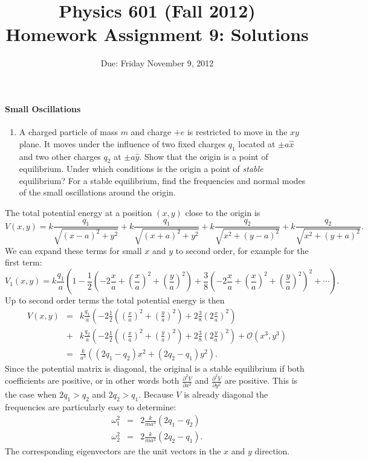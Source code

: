 \documentclass[letterpaper,11pt]{article}
\title{Physics 601 (Fall 2012) \\ Homework Assignment 9: Solutions}
\date{Due: Friday November 9, 2012}
\begin{document}
\maketitle

\paragraph*{Small Oscillations}
\begin{enumerate}
 \item A charged particle of mass $m$ and charge $+e$ is restricted to move in the $xy$ plane.  It moves under the influence of two fixed charges $q_1$ located at $\pm a \hat{x}$ and two other charges $q_2$ at $\pm a \hat{y}$.  Show that the origin is a point of equilibrium.  Under which conditions is the origin a point of \emph{stable} equilibrium?  For a stable equilibrium, find the frequencies and normal modes of the small oscillations around the origin.
\end{enumerate}
The total potential energy at a position $(x,y)$ close to the origin is
\begin{equation*}
 V(x,y) = k \frac{q_1}{\sqrt{(x - a)^2 + y^2}} +  k \frac{q_1}{\sqrt{(x + a)^2 + y^2}} +  k \frac{q_2}{\sqrt{x^2 + (y - a)^2}} +  k \frac{q_2}{\sqrt{x^2 + (y + a)^2}}.
\end{equation*}
We can expand these terms for small $x$ and $y$ to second order, for example for the first term:
\begin{equation*}
 V_1(x,y) = k \frac{q_1}{a} \left(1 - \frac{1}{2} \left(- 2 \frac{x}{a} + \left(\frac{x}{a}\right)^2 + \left(\frac{y}{a}\right)^2 \right) + \frac{3}{8} \left(- 2 \frac{x}{a} + \left(\frac{x}{a}\right)^2 + \left(\frac{y}{a}\right)^2 \right)^2 + \cdots \right).
\end{equation*}
Up to second order terms the total potential energy is then
\begin{eqnarray*}
 V(x,y) & = & k \frac{q_1}{a} \left( - 2 \frac{1}{2} \left( \left(\frac{x}{a}\right)^2 + \left(\frac{y}{a}\right)^2 \right) + 2 \frac{3}{8} \left( 2 \frac{x}{a} \right)^2 \right) \\
 & + & k \frac{q_2}{a} \left( - 2 \frac{1}{2} \left( \left(\frac{x}{a}\right)^2 + \left(\frac{y}{a}\right)^2 \right) + 2 \frac{3}{8} \left( 2 \frac{y}{a} \right)^2 \right) + \mathcal{O}(x^3, y^3) \\
 & = & \frac{k}{a^3} \left( (2 q_1 - q_2) x^2 + (2 q_2 - q_1) y^2 \right).
\end{eqnarray*}
Since the potential matrix is diagonal, the original is a stable equilibrium if both coefficients are positive, or in other words both $\frac{\partial^2 V}{\partial x^2}$ and $\frac{\partial^2 V}{\partial y^2}$ are positive.  This is the case when $2 q_1 > q_2$ and $2 q_2 > q_1$.  Because $V$ is already diagonal the frequencies are particularly easy to determine:
\begin{eqnarray*}
 \omega_1^2 & = & 2 \frac{k}{m a^3} (2 q_1 - q_2) \\
 \omega_2^2 & = & 2 \frac{k}{m a^3} (2 q_2 - q_1).
\end{eqnarray*}
The corresponding eigenvectors are the unit vectors in the $x$ and $y$ direction.
\end{document}
